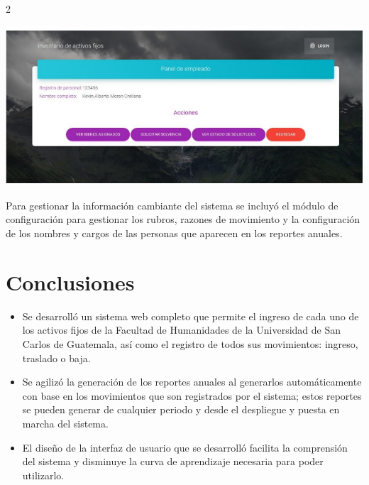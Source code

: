 \documentclass[12pt,spanish,Letterpaper,openany]{book}
\begin{document}
\begin {multicols}{2}
\begin {flushleft}
\noindent\begin{minipage}[c]{\columnwidth}

\includegraphics[width=1\linewidth]{images/07_03}

\end{minipage}

\end {flushleft}

Para gestionar la información cambiante del sistema se incluyó el módulo de configuración para gestionar los rubros, razones de movimiento y la configuración de los nombres y cargos de las personas que aparecen en los reportes anuales.

\hypertarget{conclusiones-5}{%
\section{Conclusiones}\label{conclusiones-5}}

\begin{itemize}
\item
  Se desarrolló un sistema web completo que permite el ingreso de cada uno de los activos fijos de la Facultad de Humanidades de la Universidad de San Carlos de Guatemala, así como el registro de todos sus movimientos: ingreso, traslado o baja.
\item
  Se agilizó la generación de los reportes anuales al generarlos automáticamente con base en los movimientos que son registrados por el sistema; estos reportes se pueden generar de cualquier periodo y desde el despliegue y puesta en marcha del sistema.
\item
  El diseño de la interfaz de usuario que se desarrolló facilita la comprensión del sistema y disminuye la curva de aprendizaje necesaria para poder utilizarlo.
\end{itemize}


\end{multicols}
\end{document}
